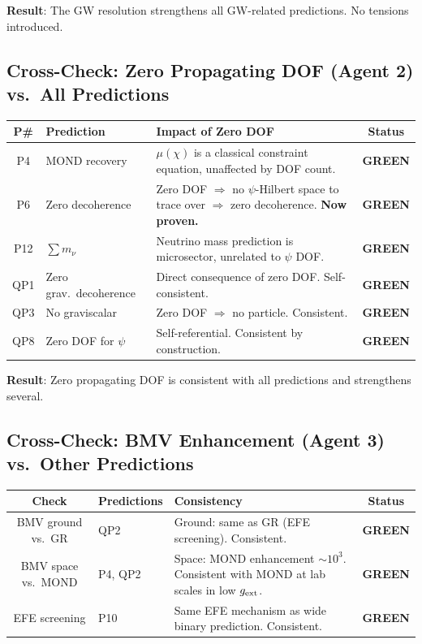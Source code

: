 \documentclass[11pt,a4paper]{article}
\newcommand{\GREEN}{\textcolor{dfdgreen}{\textbf{GREEN}}}
\begin{document}
\textbf{Result}: The GW resolution strengthens all GW-related predictions. No tensions introduced.

\subsection{Cross-Check: Zero Propagating DOF (Agent 2) vs.\ All Predictions}

\begin{center}
\begin{longtable}{clp{5.5cm}c}
\toprule
\textbf{P\#} & \textbf{Prediction} & \textbf{Impact of Zero DOF} & \textbf{Status} \\
\midrule
\endfirsthead
P4 & MOND recovery & $\mu(\chi)$ is a classical constraint equation, unaffected by DOF count. & \GREEN \\
P6 & Zero decoherence & Zero DOF $\Rightarrow$ no $\psi$-Hilbert space to trace over $\Rightarrow$ zero decoherence. \textbf{Now proven.} & \GREEN \\
P12 & $\sum m_\nu$ & Neutrino mass prediction is microsector, unrelated to $\psi$ DOF. & \GREEN \\
QP1 & Zero grav.\ decoherence & Direct consequence of zero DOF. Self-consistent. & \GREEN \\
QP3 & No graviscalar & Zero DOF $\Rightarrow$ no particle. Consistent. & \GREEN \\
QP8 & Zero DOF for $\psi$ & Self-referential. Consistent by construction. & \GREEN \\
\bottomrule
\end{longtable}
\end{center}

\textbf{Result}: Zero propagating DOF is consistent with all predictions and strengthens several.

\subsection{Cross-Check: BMV Enhancement (Agent 3) vs.\ Other Predictions}

\begin{center}
\begin{longtable}{clp{5.5cm}c}
\toprule
\textbf{Check} & \textbf{Predictions} & \textbf{Consistency} & \textbf{Status} \\
\midrule
\endfirsthead
BMV ground vs.\ GR & QP2 & Ground: same as GR (EFE screening). Consistent. & \GREEN \\
BMV space vs.\ MOND & P4, QP2 & Space: MOND enhancement $\sim 10^3$. Consistent with MOND at lab scales in low $g_{\rm ext}$. & \GREEN \\
EFE screening & P10 & Same EFE mechanism as wide binary prediction. Consistent. & \GREEN \\
\bottomrule
\end{longtable}
\end{center}
\end{document}
